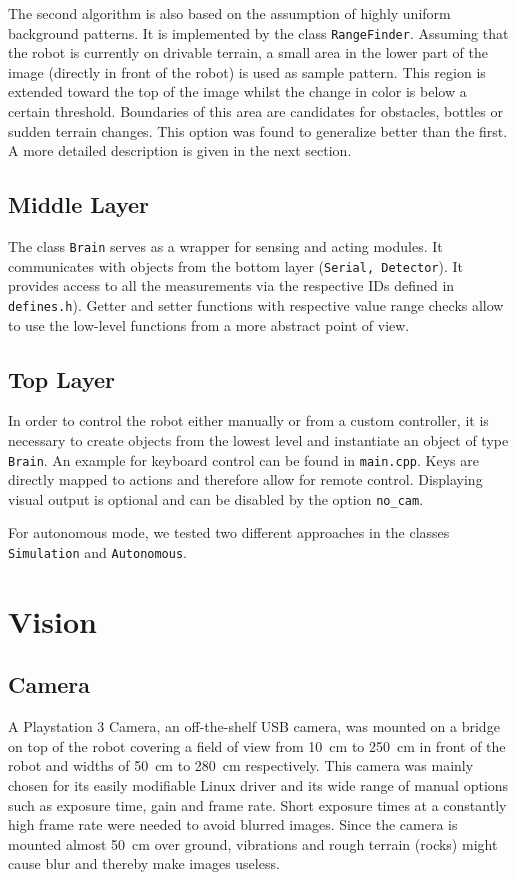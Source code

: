 The second algorithm is also based on the assumption of highly uniform background
patterns. It is implemented by the class \texttt{RangeFinder}. Assuming that the robot
is currently on drivable terrain, a small area in the lower part of the image (directly
in front of the robot) is used as sample pattern. This region is extended toward the
top of the image whilst the change in color is below a certain threshold. Boundaries
of this area are candidates for obstacles, bottles or sudden terrain changes. This 
option was found to generalize better than the first. A more detailed description is
given in the next section.

\subsection{Middle Layer}
The class \texttt{Brain} serves as a wrapper for sensing and acting modules. It 
communicates with objects from the bottom layer (\texttt{Serial, Detector}).
It provides access to all the measurements via the respective IDs defined in \texttt{defines.h}).
Getter and setter functions with respective value range checks allow to use the low-level 
functions from a more abstract point of view.

\subsection{Top Layer}
In order to control the robot either manually or from a custom controller, it is 
necessary to create objects from the lowest level and instantiate an object of type \texttt{Brain}.
An example for keyboard control can be found in \texttt{main.cpp}. Keys are directly mapped
to actions and therefore allow for remote control. Displaying visual output is optional
and can be disabled by the option \texttt{no\_cam}.

For autonomous mode, we tested two different approaches in the classes \texttt{Simulation} and
\texttt{Autonomous}.

\section{Vision}

\subsection{Camera}
A Playstation 3 Camera, an off-the-shelf USB camera, was mounted on a bridge on top of 
the robot covering a field of view from 10~cm to 250~cm in front of the robot and 
widths of 50~cm to 280~cm respectively. This camera was mainly chosen for its easily
modifiable Linux driver and its wide range of manual options such as exposure time,
gain and frame rate. Short exposure times at a constantly high frame rate were needed
to avoid blurred images. Since the camera is mounted almost 50~cm over ground, vibrations
and rough terrain (rocks) might cause blur and thereby make images useless.

